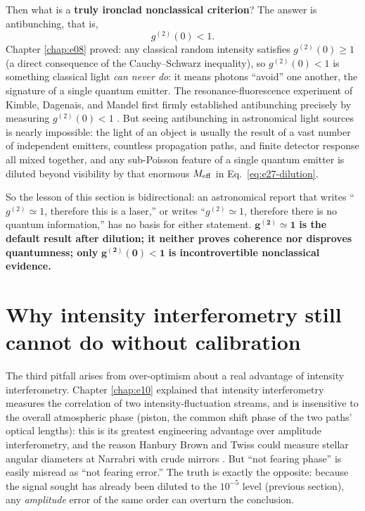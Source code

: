 Then what is a \textbf{truly ironclad nonclassical criterion}? The answer is antibunching, that is,
\[
  g^{(2)}(0)<1.
\]
Chapter \ref{chap:e08} proved: any classical random intensity satisfies \(g^{(2)}(0)\ge1\) (a direct consequence of the Cauchy--Schwarz inequality), so \(g^{(2)}(0)<1\) is something classical light \emph{can never do}: it means photons ``avoid'' one another, the signature of a single quantum emitter. The resonance-fluorescence experiment of Kimble, Dagenais, and Mandel first firmly established antibunching precisely by measuring \(g^{(2)}(0)<1\) \citep{1977PhRvL..39..691K}. But seeing antibunching in astronomical light sources is nearly impossible: the light of an object is usually the result of a vast number of independent emitters, countless propagation paths, and finite detector response all mixed together, and any sub-Poisson feature of a single quantum emitter is diluted beyond visibility by that enormous \(M_{\rm eff}\) in Eq.\ \eqref{eq:e27-dilution}.

So the lesson of this section is bidirectional: an astronomical report that writes ``\(g^{(2)}\simeq1\), therefore this is a laser,'' or writes ``\(g^{(2)}\simeq1\), therefore there is no quantum information,'' has no basis for either statement. \(\mathbf{g^{(2)}\simeq1}\) \textbf{is the default result after dilution; it neither proves coherence nor disproves quantumness; only }\(\mathbf{g^{(2)}(0)<1}\)\textbf{ is incontrovertible nonclassical evidence.}


\section{Why intensity interferometry still cannot do without calibration}
\label{sec:e27-calibration}

The third pitfall arises from over-optimism about a real advantage of intensity interferometry. Chapter \ref{chap:e10} explained that intensity interferometry measures the correlation of two intensity-fluctuation streams, and is insensitive to the overall atmospheric phase (piston, the common shift phase of the two paths' optical lengths): this is its greatest engineering advantage over amplitude interferometry, and the reason Hanbury Brown and Twiss could measure stellar angular diameters at Narrabri with crude mirrors \citep{1956Natur.178.1046H,1957RSPSA.242..300B,1974iiia.book.....H}. But ``not fearing phase'' is easily misread as ``not fearing error.'' The truth is exactly the opposite: because the signal sought has already been diluted to the \(10^{-5}\) level (previous section), any \emph{amplitude} error of the same order can overturn the conclusion.

